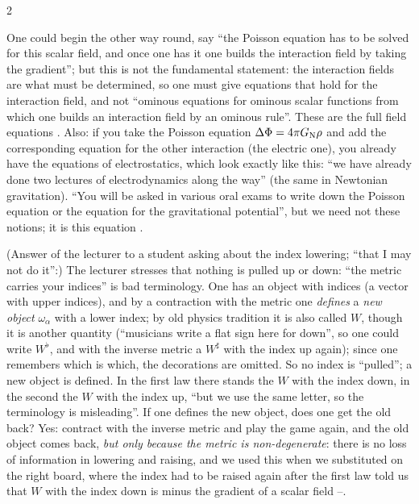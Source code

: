 \begin{paracol}{2}
\begin{coursenote}\label{cn:ng-lowering}
One could begin the other way round, say ``the Poisson equation has to be solved for this scalar field, and once one has it one builds the interaction field by taking the gradient''; but this is not the fundamental statement: the interaction fields are what must be determined, so one must give equations that hold for the interaction field, and not ``ominous equations for ominous scalar functions from which one builds
an interaction field by an ominous rule''. These are the full field equations . Also: if you take the Poisson equation $\Delta\Phi=4\pi G_{\rm N}\rho$ and add the corresponding equation for the other interaction (the electric one), you already have the equations of electrostatics, which look exactly like this: ``we have already done two lectures of electrodynamics along the way'' (the same in Newtonian gravitation). ``You will be asked in
various oral exams to write down the Poisson equation or the equation for the gravitational potential'', but we need not these notions; it is this equation .
\end{coursenote}

\begin{coursenote}\label{cn:ng-lowering2}
(Answer of the lecturer to a student asking about the index lowering; ``that I may not do it'':) The lecturer stresses that nothing is pulled up or down: ``the metric carries your indices'' is bad terminology. One has an object with indices (a vector with upper indices), and by a contraction with the metric one \emph{defines} a \emph{new object} $\omega_\alpha$ with a lower index; by old physics tradition it is also called $W$, though it is another quantity (``musicians write a flat sign here for down'', so one could write $W^\flat$, and with the inverse metric a $W^\sharp$ with the index up again);
since one remembers which is which, the decorations are omitted. So no index is ``pulled''; a new object is defined. In the first law there stands the $W$ with the index down, in the second the $W$ with the index up, ``but we use the same letter, so the terminology is misleading''. If one defines the new object, does one get the old back? Yes: contract with the inverse metric and play the game again, and the old object comes back, \emph{but only because the metric is non-degenerate}: there is no loss of information in lowering and raising,
and we used this when we substituted on the right board, where the index had to be raised again after the first law told us that $W$ with the index down is minus the gradient of a scalar field --.
\end{coursenote}


\end{paracol}
